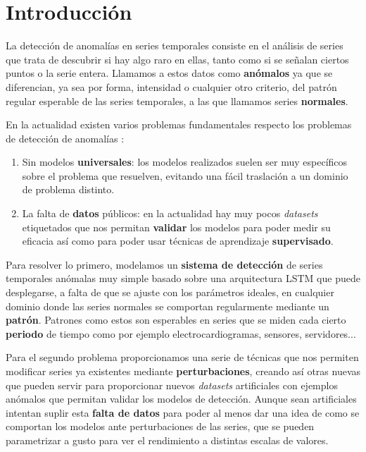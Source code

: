 
\chapter{Introducción}\label{ch:ad-introduccion}

La detección de anomalías en series temporales consiste en el análisis de series que trata de descubrir si hay algo raro en ellas, tanto como si se señalan ciertos puntos o la serie entera. Llamamos a estos datos como \textbf{anómalos} ya que se diferencian, ya sea por forma, intensidad o cualquier otro criterio, del patrón regular esperable de las series temporales, a las que llamamos series \textbf{normales}.

En la actualidad existen varios problemas fundamentales respecto los problemas de detección de anomalías \cite{ahmed2016survey}:

\begin{enumerate}
  \item Sin modelos \textbf{universales}: los modelos realizados suelen ser muy específicos sobre el problema que resuelven, evitando una fácil traslación a un dominio de problema distinto.
  \item La falta de \textbf{datos} públicos: en la actualidad hay muy pocos \emph{datasets} etiquetados que nos permitan \textbf{validar} los modelos para poder medir su eficacia así como para poder usar técnicas de aprendizaje \textbf{supervisado}.
\end{enumerate}

Para resolver lo primero, modelamos un \textbf{sistema de detección} de series temporales anómalas muy simple basado sobre una arquitectura LSTM que puede desplegarse, a falta de que se ajuste con los parámetros ideales, en cualquier dominio donde las series normales se comportan regularmente mediante un \textbf{patrón}. Patrones como estos son esperables en series que se miden cada cierto \textbf{periodo} de tiempo como por ejemplo electrocardiogramas, sensores, servidores...

Para el segundo problema proporcionamos una serie de técnicas que nos permiten modificar series ya existentes mediante \textbf{perturbaciones}, creando así otras nuevas que pueden servir para proporcionar nuevos \emph{datasets} artificiales con ejemplos anómalos que permitan validar los modelos de detección. Aunque sean artificiales intentan suplir esta \textbf{falta de datos} para poder al menos dar una idea de como se comportan los modelos ante perturbaciones de las series, que se pueden parametrizar a gusto para ver el rendimiento a distintas escalas de valores.

